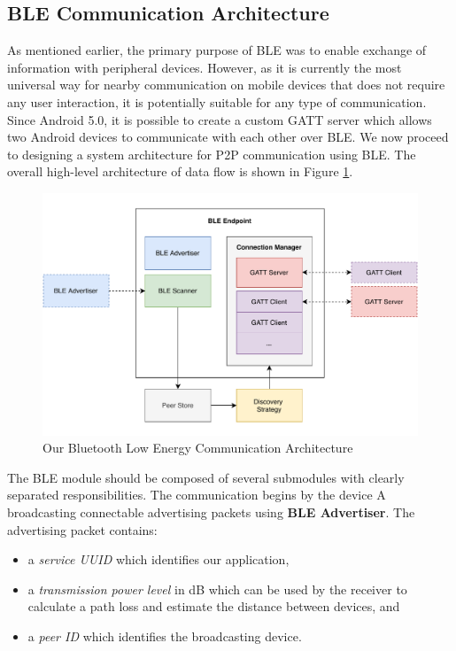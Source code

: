 \subsection{BLE Communication Architecture}

As mentioned earlier, the primary purpose of BLE was to enable exchange of information with peripheral devices. However, as it is currently the most universal way for nearby communication on mobile devices that does not require any user interaction, it is potentially suitable for any type of communication. Since Android 5.0, it is possible to create a custom GATT server which allows two Android devices to communicate with each other over BLE. We now proceed to designing a system architecture for P2P communication using BLE. The overall high-level architecture of data flow is shown in Figure \ref{ble_architecture}.

\begin{figure}
    \includegraphics[width=\textwidth]{diagrams/ipv8-ble-architecture}
    \caption{Our Bluetooth Low Energy Communication Architecture}
    \label{ble_architecture}
\end{figure}

The BLE module should be composed of several submodules with clearly separated responsibilities. The communication begins by the device A broadcasting connectable advertising packets using \textbf{BLE Advertiser}. The advertising packet contains:

\begin{itemize}
    \item a \textit{service UUID} which identifies our application,
    \item a \textit{transmission power level} in dB which can be used by the receiver to calculate a path loss and estimate the distance between devices, and
    \item a \textit{peer ID} which identifies the broadcasting device.
\end{itemize}

